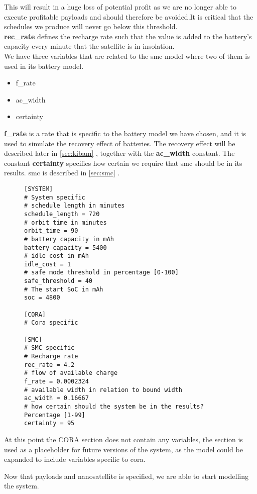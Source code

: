 This will result in a huge loss of potential profit as we are no longer able to execute profitable payloads and should therefore be avoided.It is critical that the schedules we produce will never go below this threshold.\\
\textbf{rec\_rate}  defines the recharge rate such that the value is added to the battery's capacity every minute that the satellite is in insolation.\\
We have three variables that are related to the \gls{smc} model where two of them is used in its battery model.\\
\begin{itemize}
	\item f\_rate
	\item ac\_width
	\item certainty
\end{itemize}
\textbf{f\_rate} is a rate that is specific to the battery model we have chosen, and it is used to simulate the recovery effect of batteries. The recovery effect will be described later in \cref{sec:kibam} , together with the \textbf{ac\_width} constant.
The constant \textbf{certainty} specifies how certain we require that \gls{smc} should be in its results. \gls{smc} is described in \cref{sec:smc} .
\begin{figure}[H]
\begin{lstlisting}[caption={Example of how the environment can be defined}, label=lst:ini, language=text]
[SYSTEM]
# System specific
# schedule length in minutes
schedule_length = 720
# orbit time in minutes
orbit_time = 90
# battery capacity in mAh
battery_capacity = 5400
# idle cost in mAh
idle_cost = 1
# safe mode threshold in percentage [0-100]
safe_threshold = 40
# The start SoC in mAh
soc = 4800

[CORA]
# Cora specific

[SMC]
# SMC specific
# Recharge rate
rec_rate = 4.2
# flow of available charge
f_rate = 0.0002324
# available width in relation to bound width
ac_width = 0.16667
# how certain should the system be in the results? Percentage [1-99]
certainty = 95
\end{lstlisting}
\end{figure}
At this point the CORA section does not contain any variables, the section is used as a placeholder for future versions of the system, as the model could be expanded to include variables specific to \gls{cora}.

Now that payloads and nanosatellite is specified, we are able to start modelling the system.
